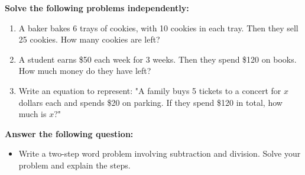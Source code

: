 \documentclass[12pt]{article}
\begin{document}
\begin{tcolorbox}[colframe=black!60, colback=white, 
coltitle=black, colbacktitle=black!15, fonttitle=\bfseries\Large, 
title=Independent Practice, halign title=center, left=10pt, right=10pt, top=10pt, bottom=15pt]
\textbf{Solve the following problems independently:}
\begin{enumerate}[itemsep=5em]
    \item A baker bakes 6 trays of cookies, with 10 cookies in each tray. Then they sell 25 cookies. How many cookies are left?
    \item A student earns \$50 each week for 3 weeks. Then they spend \$120 on books. How much money do they have left?
    \item Write an equation to represent: "A family buys 5 tickets to a concert for $x$ dollars each and spends \$20 on parking. If they spend \$120 in total, how much is $x$?"
    \vspace{3 cm}
\end{enumerate}
\end{tcolorbox}

\vspace{2em}

\begin{tcolorbox}[colframe=black!60, colback=white, 
coltitle=black, colbacktitle=black!15, fonttitle=\bfseries\Large, 
title=Exit Ticket, halign title=center, left=10pt, right=10pt, top=10pt, bottom=15pt]
\textbf{Answer the following question:}
\begin{itemize}
    \item Write a two-step word problem involving subtraction and division. Solve your problem and explain the steps.
    \vspace{4 cm}
\end{itemize}
\end{tcolorbox}
\end{document}
